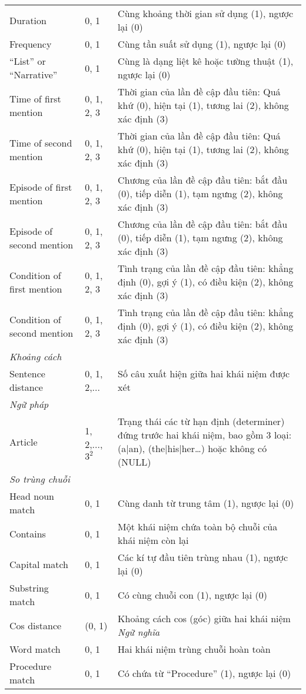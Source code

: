 \begin{table}[th]
\begin{tabularx}{\textwidth}{@{}P{\raggedright}{0.3}lL@{}}
Duration & 0, 1 & Cùng khoảng thời gian sử dụng (1), ngược lại (0)\\
Frequency & 0, 1 & Cùng tần suất sử dụng (1), ngược lại (0)\\
``List'' or ``Narrative'' & 0, 1 & Cùng là dạng liệt kê hoặc tường thuật (1), ngược lại (0)\\
Time of first mention & 0, 1, 2, 3 & Thời gian của lần đề cập đầu tiên: Quá khứ (0), hiện tại (1), tương lai (2), không xác định (3)\\
Time of second mention & 0, 1, 2, 3 & Thời gian của lần đề cập đầu tiên: Quá khứ (0), hiện tại (1), tương lai (2), không xác định (3)\\
Episode of first mention & 0, 1, 2, 3 & Chương của lần đề cập đầu tiên: bắt đầu (0), tiếp diễn (1), tạm ngưng (2), không xác định (3)\\
Episode of second mention & 0, 1, 2, 3 & Chương của lần đề cập đầu tiên: bắt đầu (0), tiếp diễn (1), tạm ngưng (2), không xác định (3)\\
Condition of first mention & 0, 1, 2, 3 & Tình trạng của lần đề cập đầu tiên: khẳng định (0), gợi ý (1), có điều kiện (2), không xác định (3)\\
Condition of second mention & 0, 1, 2, 3 & Tình trạng của lần đề cập đầu tiên: khẳng định (0), gợi ý (1), có điều kiện (2), không xác định (3)\\
\textit{Khoảng cách}\\
Sentence distance & 0, 1, 2,... & Số câu xuất hiện giữa hai khái niệm được xét\\
\textit{Ngữ pháp}\\
Article & 1, 2,..., $3^{2}$ & Trạng thái các từ hạn định (determiner) đứng trước hai khái niệm, bao gồm 3 loại: (a|an), (the|his|her…) hoặc không có (NULL)\\
\textit{So trùng chuỗi}\\
Head noun match & 0, 1 & Cùng danh từ trung tâm (1), ngược lại (0)\\
Contains & 0, 1 & Một khái niệm chứa toàn bộ chuỗi của khái niệm còn lại\\
Capital match & 0, 1 & Các kí tự đầu tiên trùng nhau (1), ngược lại (0)\\
Substring match & 0, 1 & Có cùng chuỗi con (1), ngược lại (0)\\
Cos distance & (0, 1) & Khoảng cách cos (góc) giữa hai khái niệm
\textit{Ngữ nghĩa}\\
Word match & 0, 1 & Hai khái niệm trùng chuỗi hoàn toàn\\
Procedure match & 0, 1 & Có chứa từ ``Procedure'' (1), ngược lại (0)\\
\bottomrule
\end{tabularx}
\end{table}
